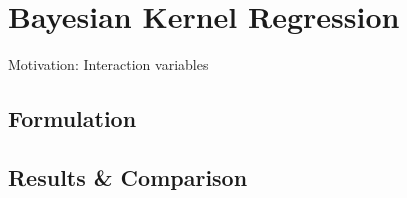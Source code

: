 \section{Bayesian Kernel Regression}\label{sec:experiments}
Motivation: Interaction variables
\subsection{Formulation}
\subsection{Results \& Comparison}